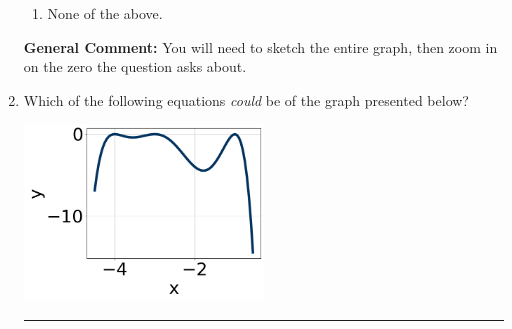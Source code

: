 \documentclass{extbook}[14pt]
\newcommand{\litem}[1]{\item #1

\rule{\textwidth}{0.4pt}}
\begin{document}
\begin{enumerate}
{\begin{enumerate}[label=\Alph*.]
\item None of the above.\end{enumerate}
\textbf{General Comment:} You will need to sketch the entire graph, then zoom in on the zero the question asks about.
}
\litem{
Which of the following equations \textit{could} be of the graph presented below?

\begin{center}
    \includegraphics[width=0.5\textwidth]{../Figures/polyGraphToFunctionCopyA.png}
\end{center}


}
\end{enumerate}
\end{document}
